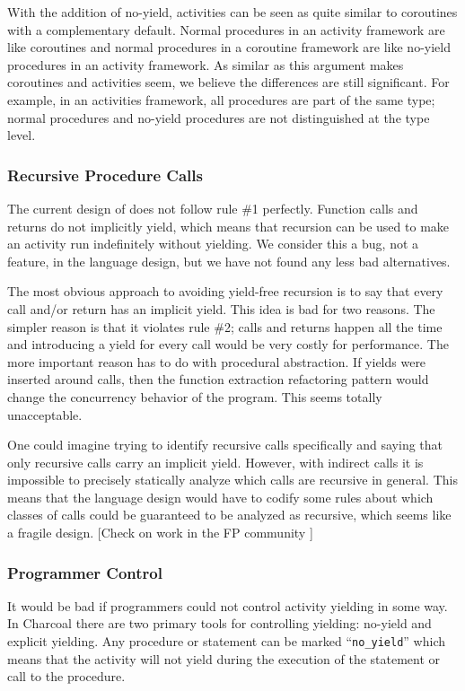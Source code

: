 \documentclass[10pt,preprint]{sigplanconf}
\begin{document}
With the addition of no-yield, activities can be seen as quite similar to coroutines with a complementary default.
Normal procedures in an activity framework are like coroutines and normal procedures in a coroutine framework are like no-yield procedures in an activity framework.
As similar as this argument makes coroutines and activities seem, we believe the differences are still significant.
For example, in an activities framework, all procedures are part of the same type; normal procedures and no-yield procedures are not distinguished at the type level.

\subsubsection{Recursive Procedure Calls}

The current design of \charcoal{} does not follow rule \#1 perfectly.
Function calls and returns do not implicitly yield, which means that recursion can be used to make an activity run indefinitely without yielding.
We consider this a bug, not a feature, in the language design, but we have not found any less bad alternatives.

The most obvious approach to avoiding yield-free recursion is to say that every call and/or return has an implicit yield.
This idea is bad for two reasons.
The simpler reason is that it violates rule \#2; calls and returns happen all the time and introducing a yield for every call would be very costly for performance.
The more important reason has to do with procedural abstraction.
If yields were inserted around calls, then the function extraction refactoring pattern would change the concurrency behavior of the program.
This seems totally unacceptable.

One could imagine trying to identify recursive calls specifically and saying that only recursive calls carry an implicit yield.
However, with indirect calls it is impossible to precisely statically analyze which calls are recursive in general.
This means that the language design would have to codify some rules about which classes of calls could be guaranteed to be analyzed as recursive, which seems like a fragile design.
[Check on work in the FP community ]

\subsubsection{Programmer Control}

It would be bad if programmers could not control activity yielding in some way.
In Charcoal there are two primary tools for controlling yielding: no-yield and explicit yielding.
Any procedure or statement can be marked ``\texttt{no\_yield}'' which means that the activity will not yield during the execution of the statement or call to the procedure.
\end{document}
